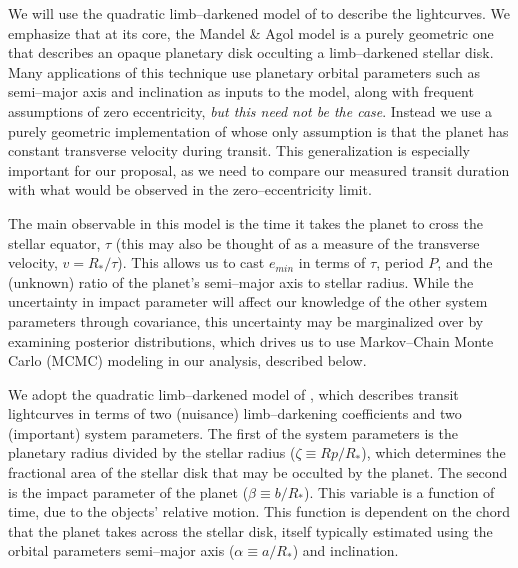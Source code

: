 We will use the quadratic limb--darkened model
of \cite{2002ApJ...580L.171M} to describe the lightcurves.  We
emphasize that at its core, the Mandel \& Agol model is a purely
geometric one that describes an opaque planetary disk occulting a
limb--darkened stellar disk.  Many applications of this technique use
planetary orbital parameters such as semi--major axis and inclination
as inputs to the model, along with frequent assumptions of zero
eccentricity, {\it but this need not be the case}.  Instead we use a
purely geometric implementation of \cite{2002ApJ...580L.171M} whose
only assumption is that the planet has constant transverse velocity
during transit.  This generalization is especially important for our
proposal, as we need to compare our measured transit duration with
what would be observed in the zero--eccentricity limit.

The main observable in this model is the time it takes the planet to
cross the stellar equator, $\tau$ (this may also be thought of as a
measure of the transverse velocity, $v = R_*/\tau$).  This allows us
to cast $e_{min}$ in terms of $\tau$, period $P$, and the (unknown)
ratio of the planet's semi--major axis to stellar radius.  While the
uncertainty in impact parameter will affect our knowledge of the other
system parameters through covariance, this uncertainty may be
marginalized over by examining posterior distributions, which drives
us to use Markov--Chain Monte Carlo (MCMC) modeling in our analysis,
described below.


\medskip
{\centerline{}}
\smallskip


We adopt the quadratic limb--darkened model
of \cite{2002ApJ...580L.171M}, which describes transit lightcurves in
terms of two (nuisance) limb--darkening coefficients and two
(important) system parameters.  The first of the system parameters is
the planetary radius divided by the stellar radius ($\zeta \equiv
Rp/R_*$), which determines the fractional area of the stellar disk
that may be occulted by the planet.  The second is the impact
parameter of the planet ($\beta \equiv b/R_*$).  This variable is a
function of time, due to the objects' relative motion.  This function
is dependent on the chord that the planet takes across the stellar
disk, itself typically estimated using the orbital parameters
semi--major axis ($\alpha \equiv a/R_*$) and inclination.

